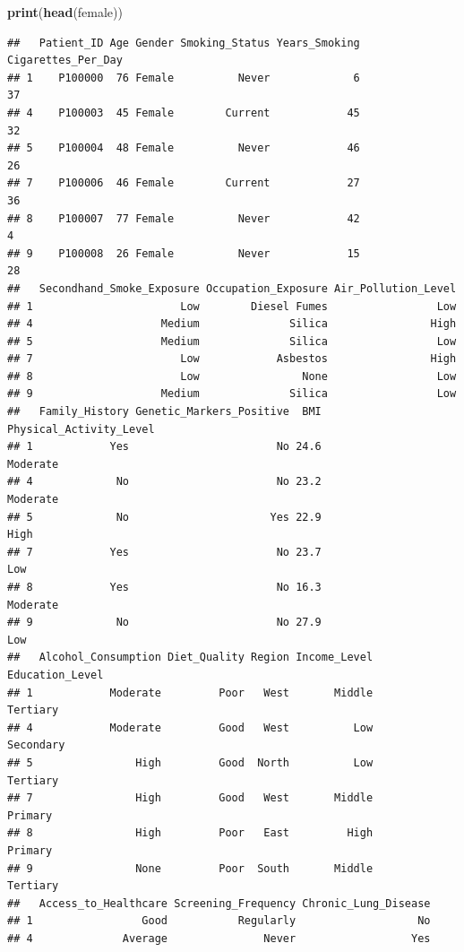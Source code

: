 \documentclass[
]{article}
\newenvironment{Shaded}{\begin{snugshade}}{\end{snugshade}}
\newcommand{\FunctionTok}[1]{\textcolor[rgb]{0.13,0.29,0.53}{\textbf{#1}}}
\newcommand{\NormalTok}[1]{#1}
\begin{document}
\begin{Shaded}
\begin{Highlighting}[]
\FunctionTok{print}\NormalTok{(}\FunctionTok{head}\NormalTok{(female))}
\end{Highlighting}
\end{Shaded}

\begin{verbatim}
##   Patient_ID Age Gender Smoking_Status Years_Smoking Cigarettes_Per_Day
## 1    P100000  76 Female          Never             6                 37
## 4    P100003  45 Female        Current            45                 32
## 5    P100004  48 Female          Never            46                 26
## 7    P100006  46 Female        Current            27                 36
## 8    P100007  77 Female          Never            42                  4
## 9    P100008  26 Female          Never            15                 28
##   Secondhand_Smoke_Exposure Occupation_Exposure Air_Pollution_Level
## 1                       Low        Diesel Fumes                 Low
## 4                    Medium              Silica                High
## 5                    Medium              Silica                 Low
## 7                       Low            Asbestos                High
## 8                       Low                None                 Low
## 9                    Medium              Silica                 Low
##   Family_History Genetic_Markers_Positive  BMI Physical_Activity_Level
## 1            Yes                       No 24.6                Moderate
## 4             No                       No 23.2                Moderate
## 5             No                      Yes 22.9                    High
## 7            Yes                       No 23.7                     Low
## 8            Yes                       No 16.3                Moderate
## 9             No                       No 27.9                     Low
##   Alcohol_Consumption Diet_Quality Region Income_Level Education_Level
## 1            Moderate         Poor   West       Middle        Tertiary
## 4            Moderate         Good   West          Low       Secondary
## 5                High         Good  North          Low        Tertiary
## 7                High         Good   West       Middle         Primary
## 8                High         Poor   East         High         Primary
## 9                None         Poor  South       Middle        Tertiary
##   Access_to_Healthcare Screening_Frequency Chronic_Lung_Disease
## 1                 Good           Regularly                   No
## 4              Average               Never                  Yes

\end{verbatim}
\end{document}

